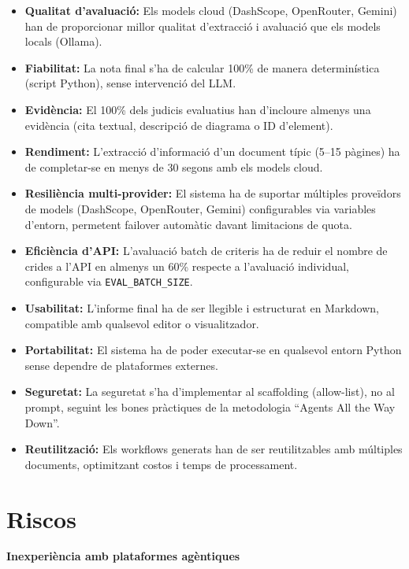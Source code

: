 \documentclass[12pt,a4paper,twoside]{report}
\begin{document}
\begin{itemize}
    \item \textbf{Qualitat d'avaluaci\'o:} Els models cloud (DashScope, OpenRouter, Gemini) han de proporcionar millor qualitat d'extracci\'o i avaluaci\'o que els models locals (Ollama).
    \item \textbf{Fiabilitat:} La nota final s'ha de calcular 100\% de manera determin\'istica (script Python), sense intervenci\'o del LLM.
    \item \textbf{Evid\`encia:} El 100\% dels judicis evaluatius han d'incloure almenys una evid\`encia (cita textual, descripci\'o de diagrama o ID d'element).
    \item \textbf{Rendiment:} L'extracci\'o d'informaci\'o d'un document t\'ipic (5--15 p\`agines) ha de completar-se en menys de 30 segons amb els models cloud.
    \item \textbf{Resili\`encia multi-provider:} El sistema ha de suportar m\'ultiples prove\"idors de models (DashScope, OpenRouter, Gemini) configurables via variables d'entorn, permetent failover autom\`atic davant limitacions de quota.
    \item \textbf{Efici\`encia d'API:} L'avaluaci\'o batch de criteris ha de reduir el nombre de crides a l'API en almenys un 60\% respecte a l'avaluaci\'o individual, configurable via \texttt{EVAL\_BATCH\_SIZE}.
    \item \textbf{Usabilitat:} L'informe final ha de ser llegible i estructurat en Markdown, compatible amb qualsevol editor o visualitzador.
    \item \textbf{Portabilitat:} El sistema ha de poder executar-se en qualsevol entorn Python sense dependre de plataformes externes.
    \item \textbf{Seguretat:} La seguretat s'ha d'implementar al scaffolding (allow-list), no al prompt, seguint les bones pr\`actiques de la metodologia ``Agents All the Way Down''.
    \item \textbf{Reutilitzaci\'o:} Els workflows generats han de ser reutilitzables amb m\'ultiples documents, optimitzant costos i temps de processament.
\end{itemize}

\section{Riscos}
\label{sec:riscos-abast}

\textbf{Inexperi\`encia amb plataformes ag\`entiques}
\end{document}
